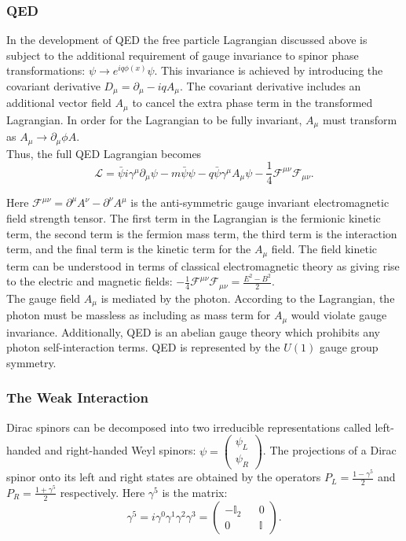 \subsubsection{QED}
In the development of QED the free particle Lagrangian discussed above is subject to the additional requirement of gauge invariance to spinor phase transformations: $\psi\rightarrow e^{iq\phi(x)}\psi$. This invariance is achieved by introducing the covariant derivative $D_{\mu}=\partial_{\mu}-iqA_{\mu}$. The covariant derivative includes an additional vector field $A_{\mu}$ to cancel the extra phase term in the transformed Lagrangian. In order for the Lagrangian to be fully invariant, $A_{\mu}$ must transform as $A_{\mu}\rightarrow \partial_{\mu}\phi A$.\\

Thus, the full QED Lagrangian becomes $$\mathcal{L}=\bar{\psi}i\gamma^{\mu}\partial_{\mu}\psi - m\bar{\psi}\psi - q\bar{\psi}\gamma^{\mu}A_{\mu}\psi - \frac{1}{4}\mathcal{F}^{\mu\nu}\mathcal{F}_{\mu\nu}.$$

\noindent Here $\mathcal{F}^{\mu\nu}=\partial^{\mu}A^{\nu} - \partial^{\nu}A^{\mu}$ is the  anti-symmetric gauge invariant electromagnetic field strength tensor. The first term in the Lagrangian is the fermionic kinetic term, the second term is the fermion mass term, the third term is the interaction term, and the final term is the kinetic term for the $A_{\mu}$ field. The field kinetic term can be understood in terms of classical electromagnetic theory as giving rise to the electric and magnetic fields: $-\frac{1}{4}\mathcal{F}^{\mu\nu}\mathcal{F}_{\mu\nu}=\frac{E^2-B^2}{2}$.\\

The gauge field $A_{\mu}$ is mediated by the photon. According to the Lagrangian, the photon must be massless as including as mass term for $A_{\mu}$ would violate gauge invariance. Additionally, QED is an abelian gauge theory which prohibits any photon self-interaction terms. QED is represented by the $U(1)$ gauge group symmetry.

\subsubsection{The Weak Interaction}\label{sec:weak}
Dirac spinors can be decomposed into two irreducible representations called left-handed and right-handed Weyl spinors:
$\psi=\begin{pmatrix}\psi_L \\ \psi_R \end{pmatrix}$. The projections of a Dirac spinor onto its left and right states are obtained by the operators $P_L=\frac{1-\gamma^5}{2}$ and $P_R=\frac{1+\gamma^5}{2}$ respectively. Here $\gamma^5$ is the matrix:
$$\gamma^5=i\gamma^0\gamma^1\gamma^2\gamma^3= \begin{pmatrix} -\mathbb{I}_2 && 0\\ 0 && \mathbb{I} \end{pmatrix}.
$$

